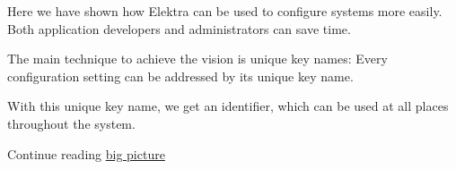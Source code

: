 Here we have shown how Elektra can be used to configure systems more easily. Both application developers and administrators can save time.

The main technique to achieve the vision is unique key names\+: Every configuration setting can be addressed by its unique key name.

With this unique key name, we get an identifier, which can be used at all places throughout the system.


\begin{DoxyItemize}
\item Continue reading \hyperlink{doc_BIGPICTURE_md}{big picture} 
\end{DoxyItemize}